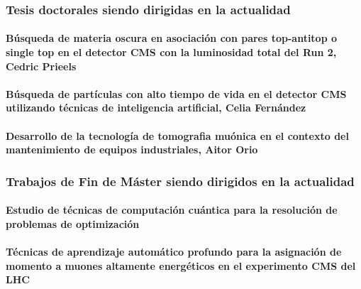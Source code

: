 \documentclass[a4paper, 11pt, twoside, openright]{report}
\begin{document}
\subsubsection{Tesis doctorales siendo dirigidas en la actualidad}

\paragraph{Búsqueda de materia oscura en asociación con pares top-antitop o single top en el detector CMS con la luminosidad total del Run 2, Cedric Prieels}


\paragraph{Búsqueda de partículas con alto tiempo de vida en el detector CMS utilizando técnicas de inteligencia artificial, Celia Fernández}


\paragraph{Desarrollo de la tecnología de tomografia muónica en el contexto del mantenimiento de equipos industriales, Aitor Orio}


\subsubsection{Trabajos de Fin de Máster siendo dirigidos en la actualidad}

\paragraph{Estudio de técnicas de computación cuántica para la resolución de problemas de optimización}


\paragraph{Técnicas de aprendizaje automático profundo para la asignación de momento a muones altamente energéticos en el experimento CMS del LHC}

\end{document}
